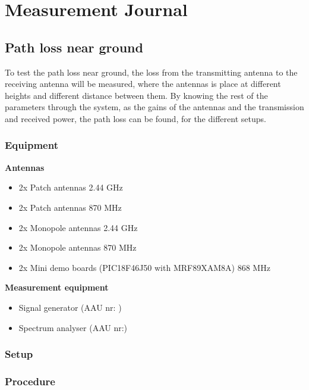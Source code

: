\chapter{Measurement Journal}

\section*{Path loss near ground}
To test the path loss near ground, the loss from the transmitting antenna to the receiving antenna will be measured, where the antennas is place at different heights and different distance between them. By knowing the rest of the parameters through the system, as the gains of the antennas and the transmission and received power, the path loss can be found, for the different setups.

\subsection*{Equipment}
\textbf{Antennas}
\begin{itemize}
\item 2x Patch antennas 2.44 GHz
\item 2x Patch antennas 870 MHz
\item 2x Monopole antennas 2.44 GHz
\item 2x Monopole antennas 870 MHz
\item 2x Mini demo boards (PIC18F46J50 with MRF89XAM8A) 868 MHz
\end{itemize}

\textbf{Measurement equipment}
\begin{itemize}
\item Signal generator (AAU nr: )
\item Spectrum analyser (AAU nr:)
\end{itemize}
\subsection*{Setup}

\subsection*{Procedure}

